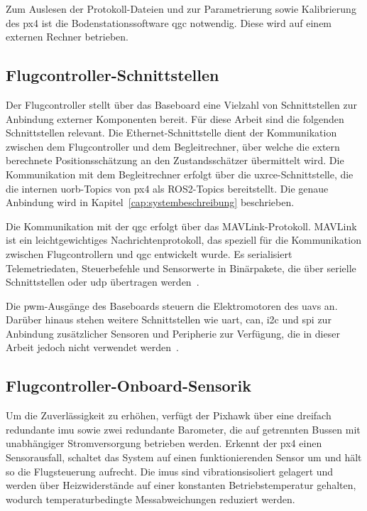 Zum Auslesen der Protokoll-Dateien und zur Parametrierung sowie Kalibrierung des \gls{px4} ist die Bodenstationssoftware \gls{qgc} notwendig.
Diese wird auf einem externen Rechner betrieben.


\subsection*{Flugcontroller-Schnittstellen}
\label{sec:px4_schnittstellen}
Der Flugcontroller stellt über das Baseboard eine Vielzahl von Schnittstellen zur Anbindung 
externer Komponenten bereit.
Für diese Arbeit sind die folgenden Schnittstellen relevant.
Die Ethernet-Schnittstelle dient der Kommunikation zwischen dem 
Flugcontroller und dem Begleitrechner, über welche die extern berechnete Positionsschätzung 
an den Zustandsschätzer übermittelt wird.
Die Kommunikation mit dem Begleitrechner erfolgt über die \gls{uxrce}-Schnittstelle, 
die die internen \gls{uorb}-Topics von \gls{px4} als ROS2-Topics bereitstellt.
Die genaue Anbindung wird in Kapitel~\ref{cap:systembeschreibung} beschrieben.~\cite{px4_uxrce_dds}
 
Die Kommunikation mit der \gls{qgc} erfolgt über das MAVLink-Protokoll.
MAVLink ist ein leichtgewichtiges Nachrichtenprotokoll, das speziell für die 
Kommunikation zwischen Flugcontrollern und \gls{qgc} entwickelt wurde.
Es serialisiert Telemetriedaten, Steuerbefehle und Sensorwerte in Binärpakete, 
die über serielle Schnittstellen oder \gls{udp} übertragen werden~\cite{MAVLink,px4_mavlink}.


Die \gls{pwm}-Ausgänge des Baseboards steuern die Elektromotoren des \gls{uav}s an.
Darüber hinaus stehen weitere Schnittstellen wie \gls{uart}, \gls{can}, \gls{i2c} und \gls{spi} zur 
Anbindung zusätzlicher Sensoren und Peripherie zur Verfügung, die in dieser Arbeit jedoch 
nicht verwendet werden~\cite{px4_pixhawk6x_doc}.

\subsection*{Flugcontroller-Onboard-Sensorik}
\label{sec:pixhawk_sensorik}
Um die Zuverlässigkeit zu erhöhen, verfügt der Pixhawk über eine dreifach redundante \gls{imu} sowie zwei redundante 
Barometer, die auf getrennten Bussen mit unabhängiger Stromversorgung betrieben werden.
Erkennt der \gls{px4} einen Sensorausfall, schaltet das System auf einen funktionierenden Sensor um und hält so die Flugsteuerung aufrecht.
Die \gls{imu}s sind vibrationsisoliert gelagert und werden über Heizwiderstände auf einer konstanten Betriebstemperatur gehalten, 
wodurch temperaturbedingte Messabweichungen reduziert werden.~\cite{px4_pixhawk6x_doc}

